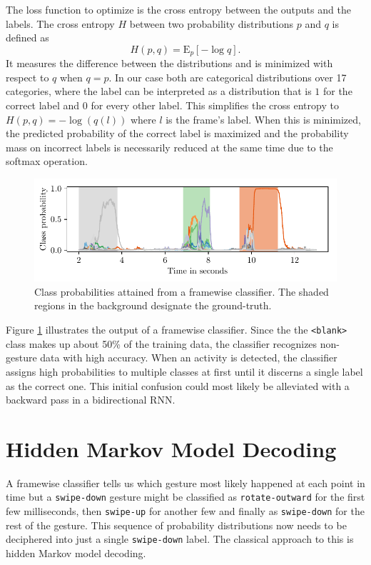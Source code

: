 The loss function to optimize is the cross entropy between the outputs and the
labels. The cross entropy $H$ between two probability distributions $p$ and $q$
is defined as
\begin{equation*}
  H(p, q) = \mathrm{E}_{p} \left[ -\log q \right].
\end{equation*}
It measures the difference between the distributions and is minimized with
respect to $q$ when $q = p$. In our case both are categorical distributions over
17 categories, where the label can be interpreted as a distribution that is $1$
for the correct label and $0$ for every other label. This simplifies the cross
entropy to $H(p, q) = -\log(q(l))$ where $l$ is the frame's label. When this is
minimized, the predicted probability of the correct label is maximized and the
probability mass on incorrect labels is necessarily reduced at the same time due
to the softmax operation.

\begin{figure}[h]
  \centering
  \includegraphics{figures/methods/framewise}
  \caption{Class probabilities attained from a framewise classifier. The shaded
    regions in the background designate the ground-truth.}
  \label{fig:framewise-p}
\end{figure}

Figure \ref{fig:framewise-p} illustrates the output of a framewise classifier.
Since the the \texttt{<blank>} class makes up about 50\% of the training data,
the classifier recognizes non-gesture data with high accuracy. When an activity
is detected, the classifier assigns high probabilities to multiple classes at
first until it discerns a single label as the correct one. This initial
confusion could most likely be alleviated with a backward pass in a
bidirectional RNN.

\section{Hidden Markov Model Decoding}
\label{sec:hmm}

A framewise classifier tells us which gesture most likely happened at each point
in time but a \texttt{swipe-down} gesture might be classified as
\texttt{rotate-outward} for the first few milliseconds, then \texttt{swipe-up}
for another few and finally as \texttt{swipe-down} for the rest of the gesture.
This sequence of probability distributions now needs to be deciphered into just
a single \texttt{swipe-down} label. The classical approach to this is hidden
Markov model decoding.


